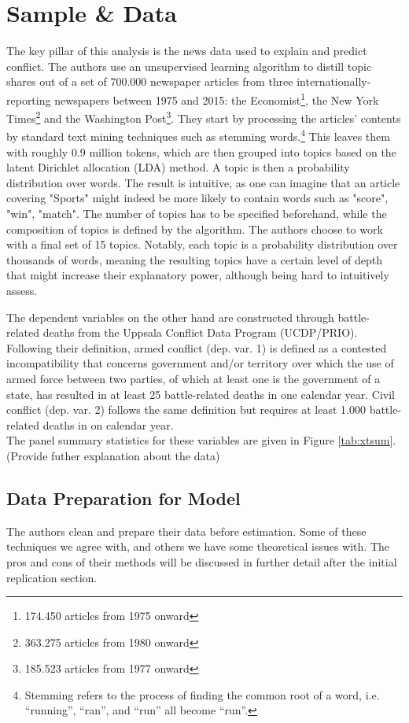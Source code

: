 \section{Sample \& Data}
The key pillar of this analysis is the news data used to explain and predict conflict.
The authors use an unsupervised learning algorithm to distill topic shares out of a set of 700.000 newspaper articles from three internationally-reporting newspapers between 1975 and 2015: the Economist\footnote{174.450 articles from 1975 onward}, the New York Times\footnote{363.275 articles from 1980 onward} and the Washington Post\footnote{185.523 articles from 1977 onward}.
They start by processing the articles' contents by standard text mining techniques such as stemming words.\footnote{Stemming refers to the process of finding the common root of a word, i.e. “running”, “ran”, and “run” all become “run”.}
This leaves them with roughly 0.9 million tokens, which are then grouped into topics based on the latent Dirichlet allocation (LDA) method.
A topic is then a probability distribution over words.
The result is intuitive, as one can imagine that an article covering "Sports" might indeed be more likely to contain words such as "score", "win", "match".
The number of topics has to be specified beforehand, while the composition of topics is defined by the algorithm.
The authors choose to work with a final set of 15 topics.
Notably, each topic is a probability distribution over thousands of words, meaning the resulting topics have a certain level of depth that might increase their explanatory power, although being hard to intuitively assess.

The dependent variables on the other hand are constructed through battle-related deaths from the Uppsala Conflict Data Program (UCDP/PRIO).
Following their definition, armed conflict (dep. var. 1) is defined as a contested incompatibility that concerns government and/or territory over which the use of armed force between two parties, of which at least one is the government of a state, has resulted in at least 25 battle-related deaths in one calendar year.
Civil conflict (dep. var. 2) follows the same definition but requires at least 1.000 battle-related deaths in on calendar year. \\

The panel summary statistics for these variables are given in Figure \ref{tab:xtsum}. (Provide futher explanation about the data)

\subsection{Data Preparation for Model} \label{data_prep}
The authors clean and prepare their data before estimation.
Some of these techniques we agree with, and others we have some theoretical issues with.
The pros and cons of their methods will be discussed in further detail after the initial replication section.


